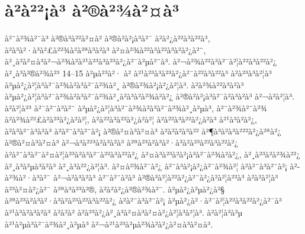 
\chapter{à²à²²¡à³ à²®à²¾à²¤à³}

à²¨à²¾à²¨à³ à²®à³à²²à²¤à² à²®à²à²¡à³à²¯ à²à²¿à²²à³à²²à³, à²à³à²·à³à²£à²²¾à²à²ªà³à²à³ à²¤à²¾à²²à³à²²à³à²à²¿à²¨, à²¸à²à²¤à³à²¬à²¾à²à²¹à²³à³à²³à²¿à²¯à²µà²¨à³. à²¬à²¾à²²à³à²¯à²¦à²²à³à²²à²¿ à²¸à³à²®à²¾à²³ 14–15 à²µà²³à²· à² à²¹à²³à³à²³à²¿à²¯à²²à³à²²à³ à²à²³à³à²¦à³ à²µà²¿à²¦à³à²¯à²¾à²­à³à²¯à²¾à²¸ à²®à²¾à²¡à²¿à²¦à³. à²à²¾à²²à³à²à³ à²µà²¿à²¦à³à²¯à²¾à²­à³à²¯à²¾à²¸à²à³à²à²¾à²à²¿ à²®à²à²¡à³à²¯à²à³à²à³ à²¬à²à²¦à³. à²à²¦à²³ à²¨à²¨à³à²¨ à²µà²¿à²¦à³à²¯à²¾à²­à³à²¯à²¾à²¸à²µà³, à²¨à²¾à²¨à²¾ à²à²¾à²²£à²à²³à²¿à²à²¦, à²à²²à³à²²à²¿à²à²¦ à²à²²à³à²²à²¿à²à³ à²¹à³à²à²¿, à²à³à²¨à³à²à³ à²à²¨à³à²¨à²¡ à²®à²¤à³à²¤à³ à²à²à²à³à²² à²¶à³à²à³à²²²à²¿à²ªà²¿ à²®à²¤à³à²¤à³ à²¬à³à²²³à²à³à²à³ à²ªà²³à²à³à²·à³à²à²³à²²à³à²²à²¿ à²à²¨à³à²¨à²¤à²¦à²³à²à³à²¯à²²à³à²²à²¿ à²¤à³à²³à²à²¡à³à²¯à²¾à²à²¿, à²¸à²³à²à²¾à²²¿ à²¸à³à²µà³à²à³ à²¸à³à²²¿à²¦à³. à²¤à²¾à²¯à²¿ à²¨à³à²¡à²¿à²¯à²¾à²¦ à²à²¨à³à²¨à²¡ à²­à²¾à²·à³à²¯ à²¬à²à³à²à³ à²¨à²¨à²à³ à²®à³à²¦à²²à²¿à²¨à²¿à²à²¦à²²à³ à²à²à²¦à³ à²³à²¤à²¿à²¯ à²ªà³à²³à²®, à²à²­à²¿à²®à²¾à²¨. à²µà²¿à²µà²¿à²§ à²ªà²³à²à³à²·à³à²à²³à²²à³à²²à²¿ à²à²¨à³à²¨à²¡ à²µà²¿à²·à²¯à²¦à²²à³à²²à²¿à²¯à³ à²¹à³à²à³à²à³ à²à²à² à²à²³à²¿à²¸à³à²¤à³à²¤à²¿à²¦à³à²¦à³. à²à²¦à³à²µ à²¹à²µà³à²¯à²¾à²¸à²µà³ à²¬à²¹à²³à²µà²¾à²à²¿à²¤à³à²¤à³. 

